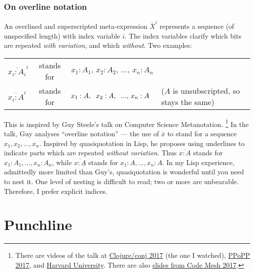 \documentclass{article}
\begin{document}
\subsubsection{On overline notation}

An overlined and superscripted meta-expression $\overline{X}^i$ represents a
sequence (of unspecified length) with index variable $i$. The index variables
clarify which bits are repeated \emph{with variation}, and which \emph{without}.
Two examples:

\begin{center}
  \begin{tabular}{lcll}
    $\overline{x_i : A_i}^i$ & stands for
    & $x_1 : A_1,\, x_2 : A_2,\, ...,\, x_n : A_n$
    \\
    $\overline{x_i : A}^i$ & stands for
    & $x_1 : A,\hspace{0.6em} x_2 : A,\hspace{0.6em} ...,\, x_n : A$
    & ($A$ is unsubscripted, so stays the same)
  \end{tabular}
\end{center}

This is inspired by Guy Steele's talk on Computer Science Metanotation.%
\footnote{There are videos of the talk at
  \href{https://www.youtube.com/watch?v=dCuZkaaou0Q}{Clojure/conj 2017} (the one
  I watched), \href{https://www.youtube.com/watch?v=7HKbjYqqPPQ}{PPoPP 2017},
  and
  \href{https://www.youtube.com/watch?v=8fCfkGFF7X8&feature=youtu.be&t=37m46s}{Harvard
    University}. There are also
  \href{http://s3.amazonaws.com/erlang-conferences-production/media/files/000/000/755/original/Guy_L._Steele_-_A_Cobbler's_Child.pdf?1510053539}{slides
    from Code Mesh 2017}.}
In the talk, Guy analyses ``overline notation'' --- the use of $\overline{x}$ to
stand for a sequence $x_1, x_2, ..., x_n$.
Inspired by quasiquotation in Lisp, he proposes using underlines to indicate
parts which are repeated \emph{without variation}. Thus $\overline{x : A}$
stands for $x_1 : A_1, ..., x_n : A_n$, while $\overline{x : \underline{A}}$
stands for $x_1 : A, ..., x_n : A$.
In my Lisp experience, admittedly more limited than Guy's, quasiquotation is
wonderful until you need to nest it. One level of nesting is difficult to read;
two or more are unbearable. Therefore, I prefer explicit indices.


\section{Punchline}
\end{document}
